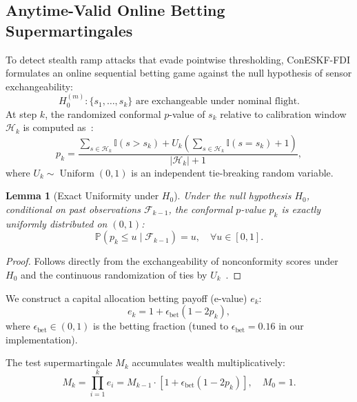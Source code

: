 \documentclass[journal,twocolumn]{IEEEtran}
\newtheorem{lemma}{Lemma}
\newcommand{\Prob}{\mathbb{P}}
\begin{document}
\subsection{Anytime-Valid Online Betting Supermartingales}
To detect stealth ramp attacks that evade pointwise thresholding, ConESKF-FDI formulates an online sequential betting game against the null hypothesis of sensor exchangeability:
\begin{equation}
    H_0^{(m)}: \{s_1, \dots, s_k\} \text{ are exchangeable under nominal flight.}
\end{equation}
At step $k$, the randomized conformal $p$-value of $s_k$ relative to calibration window $\mathcal{H}_k$ is computed as~\cite{vovk2005algorithmic}:
\begin{equation}
    p_k = \frac{\sum_{s \in \mathcal{H}_k} \mathbb{I}(s > s_k) + U_k \left( \sum_{s \in \mathcal{H}_k} \mathbb{I}(s = s_k) + 1 \right)}{|\mathcal{H}_k| + 1},
    \label{eq:conformal_p_value}
\end{equation}
where $U_k \sim \operatorname{Uniform}(0, 1)$ is an independent tie-breaking random variable.

\begin{lemma}[Exact Uniformity under $H_0$]
Under the null hypothesis $H_0$, conditional on past observations $\mathcal{F}_{k-1}$, the conformal $p$-value $p_k$ is exactly uniformly distributed on $(0, 1)$:
\begin{equation}
    \Prob\left(p_k \le u \mid \mathcal{F}_{k-1}\right) = u, \quad \forall u \in [0, 1].
\end{equation}
\end{lemma}
\begin{proof}
Follows directly from the exchangeability of nonconformity scores under $H_0$ and the continuous randomization of ties by $U_k$~\cite{vovk2005algorithmic,shafer2008tutorial}.
\end{proof}

We construct a capital allocation betting payoff (e-value) $e_k$:
\begin{equation}
    e_k = 1 + \epsilon_{\text{bet}} (1 - 2 p_k),
    \label{eq:betting_e_value}
\end{equation}
where $\epsilon_{\text{bet}} \in (0, 1)$ is the betting fraction (tuned to $\epsilon_{\text{bet}} = 0.16$ in our implementation).

The test supermartingale $M_k$ accumulates wealth multiplicatively:
\begin{equation}
    M_k = \prod_{i=1}^k e_i = M_{k-1} \cdot \left[ 1 + \epsilon_{\text{bet}} (1 - 2 p_k) \right], \quad M_0 = 1.
    \label{eq:martingale_wealth}
\end{equation}
\end{document}
